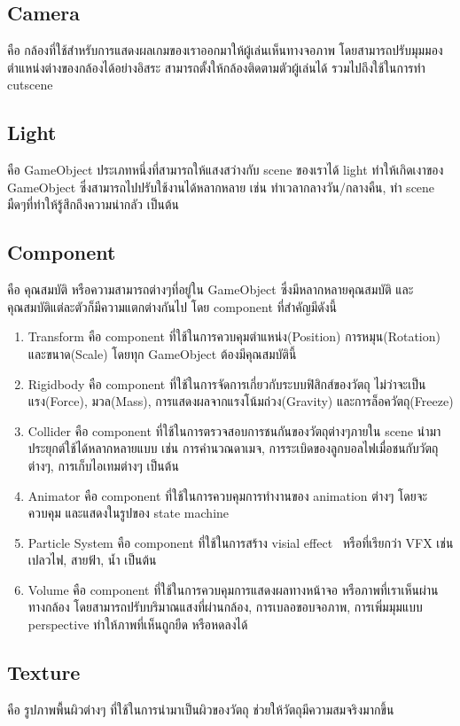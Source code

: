 \subsection{Camera}
คือ กล้องที่ใช้สำหรับการแสดงผลเกมของเราออกมาให้ผู้เล่นเห็นทางจอภาพ โดยสามารถปรับมุมมอง ตำแหน่งต่างของกล้องได้อย่างอิสระ 
สามารถตั้งให้กล้องติดตามตัวผู้เล่นได้ รวมไปถึงใช้ในการทำ cutscene
\subsection{Light}
คือ GameObject ประเภทหนึ่งที่สามารถให้แสงสว่างกับ scene ของเราได้ light ทำให้เกิดเงาของ GameObject 
ซึ่งสามารถไปปรับใช้งานได้หลากหลาย เช่น ทำเวลากลางวัน/กลางคืน, ทำ scene มืดๆที่ทำให้รู้สึกถึงความน่ากลัว เป็นต้น
\subsection{Component}
คือ คุณสมบัติ หรือความสามารถต่างๆที่อยู่ใน GameObject ซึ่งมีหลากหลายคุณสมบัติ และคุณสมบัติแต่ละตัวก็มีความแตกต่างกันไป
โดย component ที่สำคัญมีดังนี้ 

\begin{enumerate}
\item Transform คือ component ที่ใช้ในการควบคุมตำแหน่ง(Position) การหมุน(Rotation) และขนาด(Scale) 
โดยทุก GameObject ต้องมีคุณสมบัตินี้
\item Rigidbody คือ component ที่ใช้ในการจัดการเกี่ยวกับระบบฟิสิกส์ของวัตถุ ไม่ว่าจะเป็น แรง(Force), มวล(Mass), 
การแสดงผลจากแรงโน้มถ่วง(Gravity) และการล็อควัตถุ(Freeze)
\item Collider คือ component ที่ใช้ในการตรวจสอบการชนกันของวัตถุต่างๆภายใน scene นำมาประยุกต์ใช้ได้หลากหลายแบบ
เช่น การคำนวณดาเมจ, การระเบิดของลูกบอลไฟเมื่อชนกับวัตถุต่างๆ, การเก็บไอเทมต่างๆ เป็นต้น
\item Animator คือ component ที่ใช้ในการควบคุมการทำงานของ animation ต่างๆ โดยจะควบคุม และแสดงในรูปของ state machine
\item Particle System คือ component ที่ใช้ในการสร้าง visial effect~\cite{VFX} หรือที่เรียกว่า VFX เช่น เปลวไฟ, สายฟ้า, น้ำ เป็นต้น
\item Volume คือ component ที่ใช้ในการควบคุมการแสดงผลทางหน้าจอ หรือภาพที่เราเห็นผ่านทางกล้อง โดยสามารถปรับบริมาณแสงที่ผ่านกล้อง, 
การเบลอขอบจอภาพ, การเพิ่มมุมแบบ perspective ทำให้ภาพที่เห็นถูกยืด หรือหดลงได้
\end{enumerate}

\subsection{Texture}
คือ รูปภาพพื้นผิวต่างๆ ที่ใช้ในการนำมาเป็นผิวของวัตถุ ช่วยให้วัตถุมีความสมจริงมากขึ้น
